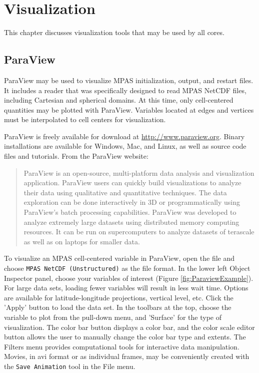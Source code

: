 
\chapter{Visualization}
\label{chap:mpas_visualization}

This chapter discusses visualization tools that may be used by all cores.

\section{ParaView}

ParaView may be used to visualize MPAS initialization, output, and restart files.  It includes a reader that was specifically designed to read MPAS NetCDF files, including Cartesian and spherical domains.  At this time, only cell-centered quantities may be plotted with ParaView.  Variables located at edges and vertices must be interpolated to cell centers for visualization.

ParaView is freely available for download at \url{http://www.paraview.org}.  Binary installations are available for Windows, Mac, and Linux, as well as source code files and tutorials.  From the ParaView website:
\begin{quotation}
ParaView is an open-source, multi-platform data analysis and visualization application. ParaView users can quickly build visualizations to analyze their data using qualitative and quantitative techniques. The data exploration can be done interactively in 3D or programmatically using ParaView's batch processing capabilities.  ParaView was developed to analyze extremely large datasets using distributed memory computing resources. It can be run on supercomputers to analyze datasets of terascale as well as on laptops for smaller data.
\end{quotation}

To visualize an MPAS cell-centered variable in ParaView, open the file and choose {\tt MPAS NetCDF (Unstructured)} as the file format.  In the lower left Object Inspector panel, choose your variables of interest (Figure \ref{fig:ParaviewExample}).  For large data sets, loading fewer variables will result in less wait time.  Options are available for latitude-longitude projections, vertical level, etc.  Click the 'Apply' button to load the data set.  In the toolbars at the top, choose the variable to plot from the pull-down menu, and 'Surface' for the type of visualization.  The color bar button displays a color bar, and the color scale editor button allows the user to manually change the color bar type and extents.  The Filters menu provides computational tools for interactive data manipulation.  Movies, in avi format or as individual frames, may be conveniently created with the {\tt Save Animation} tool in the File menu.

